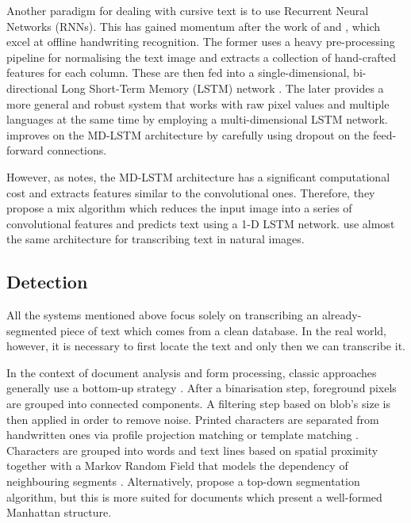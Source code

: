 		Another paradigm for dealing with cursive text is to use Recurrent Neural Networks (RNNs). This has gained momentum after the work of \citet{graves_LSTM} and \citet{graves_MDLSTM}, which excel at offline handwriting recognition. The former uses a heavy pre-processing pipeline for normalising the text image and extracts a collection of hand-crafted features for each column. These are then fed into a single-dimensional, bi-directional Long Short-Term Memory (LSTM) network \citep{LSTM_original}. The later provides a more general and robust system that works with raw pixel values and multiple languages at the same time by employing a multi-dimensional LSTM network.  improves on the MD-LSTM architecture by carefully using dropout on the feed-forward connections.

		However, as \citet{MDLSTM_vs_CNN} notes, the MD-LSTM architecture has a significant computational cost and extracts features similar to the convolutional ones. Therefore, they propose a mix algorithm which reduces the input image into a series of convolutional features and predicts text using a 1-D LSTM network.  use almost the same architecture for transcribing text in natural images.


	\subsection{Detection}\label{sec:related_detection}
		All the systems mentioned above focus solely on transcribing an already-segmented piece of text which comes from a clean database. In the real world, however, it is necessary to first locate the text and only then we can transcribe it.

		In the context of document analysis and form processing, classic approaches generally use a bottom-up strategy \citep{bottom_up}. After a binarisation step, foreground pixels are grouped into connected components. A filtering step based on blob's size is then applied in order to remove noise. Printed characters are separated from handwritten ones via profile projection matching \citep{profile_matching,moysset2014a2ia} or template matching \citep{template_matching}. Characters are grouped into words and text lines based on spatial proximity together with a Markov Random Field that models the dependency of neighbouring segments \citep{detection_mrf,detection_mrf2}. Alternatively, \citet{top_down} propose a top-down segmentation algorithm, but this is more suited for documents which present a well-formed Manhattan structure.

